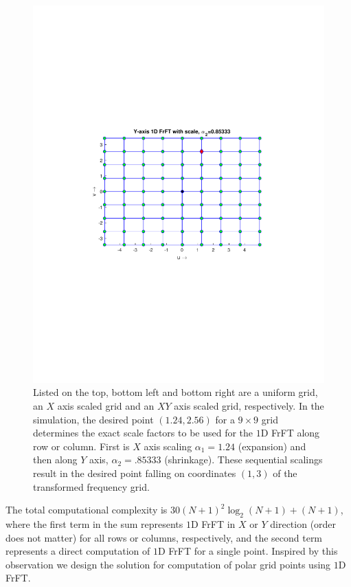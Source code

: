 \documentclass{UCF_ETD}
\begin{document}
\begin{figure}[H]
\begin{center}
 \includegraphics[scale=0.6]{PolarSphericalDFT/XYAxisScaledGrid}
 \caption{Listed on the top, bottom left and bottom right are a uniform grid, an $X$ axis scaled grid
  and an $XY$ axis scaled grid, respectively. In the simulation, the desired point $(1.24,2.56)$ for a $9 \times 9$ grid determines the exact scale factors to be used for the $1$D FrFT along row or column.  First is $X$ axis scaling $\alpha_1 = 1.24$ (expansion) and then along $Y$ axis, $\alpha_2 = .85333$ (shrinkage). These sequential scalings result in the desired point falling on coordinates $(1,3)$ of the transformed frequency grid. }
 \label{SimpleDemo.fig}
 \end{center}
 \end{figure}
  The total computational complexity is $30(N+1)^2\log_2(N+1) + (N+1)$, where the first term in the sum represents $1$D FrFT in $X$ or $Y$ direction (order does not matter) for all rows or columns, respectively, and the second term represents a direct computation of $1$D FrFT for a single point. Inspired by this observation we design the solution for computation of polar grid points using $1$D FrFT.
 
\end{document}
